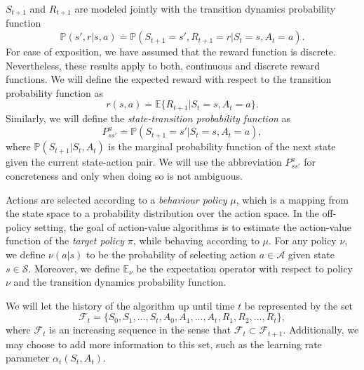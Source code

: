 $S_{t+1}$ and $R_{t+1}$ are modeled jointly with the transition dynamics probability function
%
\begin{equation}
\label{eq:transition_dynamics}
\mathbb{P}(s',r|s,a) \overset{.}{=} \mathbb{P}(S_{t+1} = s', R_{t+1} = r | S_t = s, A_t = a).
\end{equation}
%
For ease of exposition, we have assumed that the reward function is discrete.
Nevertheless, these results apply to both, continuous and discrete reward functions.
We will define the expected reward with respect to the transition probability function as
%
\begin{equation}
\label{eq:exp_reward}
r(s,a) \overset{.}{=} \mathbb{E} \{R_{t+1} | S_t = s, A_t = a \}.
\end{equation}
Similarly, we will define the \textit{state-transition probability function} as
%
\begin{equation}
\label{eq:state_transition}
P^a_{ss'} \overset{.}{=} \mathbb{P} (S_{t+1} = s' | S_t = s, A_t = a ),
\end{equation}
%
where $\mathbb{P} (S_{t+1} |S_t, A_t)$ is the marginal probability function of the next state given the current state-action pair.
We will use the abbreviation $P^a_{ss'}$ for concreteness and only when doing so is not ambiguous. 

Actions are selected according to a \textit{behaviour policy} $\mu$, which is a mapping from the state space to a probability distribution over the action space.  
In the off-policy setting, the goal of action-value algorithms is to estimate the action-value function of the \textit{target policy} $\pi$, while behaving according to $\mu$.  
For any policy $\nu$, we define $\nu(a|s)$ to be the probability of selecting action $a \in \mathcal{A}$ given state $s \in \mathcal{S}$.
Moreover, we define $\mathbb{E}_{\nu}$ be the expectation operator with respect to policy $\nu$ and the transition dynamics probability function.

We will let the history of the algorithm up until time $t$ be represented by the set
%
\begin{equation}
\label{eq:history}
\mathcal{F}_t = \{S_0, S_1, ..., S_t, A_0, A_1, ..., A_t, R_1, R_2, ..., R_{t} \},
\end{equation}
%
where $\mathcal{F}_t$ is an increasing sequence in the sense that $\mathcal{F}_t \subset \mathcal{F}_{t+1}$.
Additionally, we may choose to add more information to this set, such as the learning rate parameter $\alpha_t(S_t,A_t)$.

